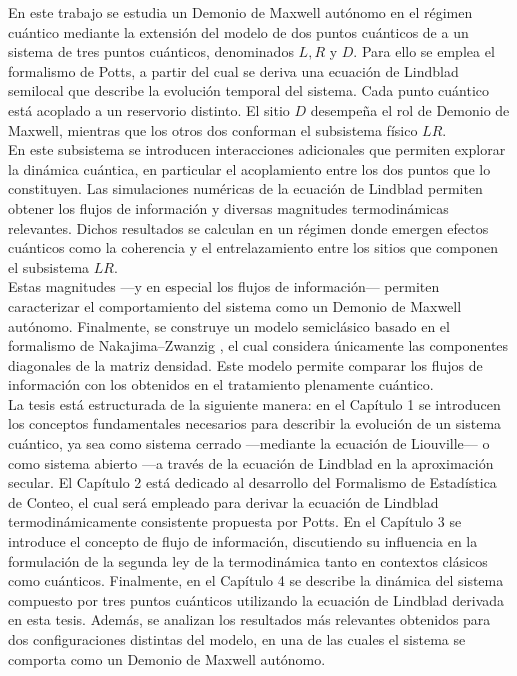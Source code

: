 En este trabajo se estudia un Demonio de Maxwell autónomo en el régimen cuántico mediante la extensión del modelo de dos puntos cuánticos de \cite{horowitz2014thermodynamics} a un sistema de tres puntos cuánticos, denominados $L,R$ y $D$. Para ello se emplea el formalismo de Potts, a partir del cual se deriva una ecuación de Lindblad semilocal que describe la evolución temporal del sistema. Cada punto cuántico está acoplado a un reservorio distinto. El sitio $D$ desempeña el rol de Demonio de Maxwell, mientras que los otros dos conforman el subsistema físico $LR$. \\

En este subsistema se introducen interacciones adicionales que permiten explorar la dinámica cuántica, en particular el acoplamiento entre los dos puntos que lo constituyen. Las simulaciones numéricas de la ecuación de Lindblad permiten obtener los flujos de información y diversas magnitudes termodinámicas relevantes. Dichos resultados se calculan en un régimen donde emergen efectos cuánticos como la coherencia y el entrelazamiento entre los sitios que componen el subsistema $LR$. \\ 

Estas magnitudes ---y en especial los flujos de información--- permiten caracterizar el comportamiento del sistema como un Demonio de Maxwell autónomo. 
Finalmente, se construye un modelo semiclásico basado en el formalismo de Nakajima--Zwanzig \cite{zwanzig1966statistical}, el cual considera únicamente las componentes diagonales de la matriz densidad. Este modelo permite comparar los flujos de información con los obtenidos en el tratamiento plenamente cuántico. \\


La tesis está estructurada de la siguiente manera: en el Capítulo 1 se introducen los conceptos fundamentales necesarios para describir la evolución de un sistema cuántico, ya sea como sistema cerrado —mediante la ecuación de Liouville— o como sistema abierto —a través de la ecuación de Lindblad en la aproximación secular. El Capítulo 2 está dedicado al desarrollo del Formalismo de Estadística de Conteo, el cual será empleado para derivar la ecuación de Lindblad termodinámicamente consistente propuesta por Potts. En el Capítulo 3 se introduce el concepto de flujo de información, discutiendo su influencia en la formulación de la segunda ley de la termodinámica tanto en contextos clásicos como cuánticos. Finalmente, en el Capítulo 4 se describe la dinámica del sistema compuesto por tres puntos cuánticos utilizando la ecuación de Lindblad derivada en esta tesis. Además, se analizan los resultados más relevantes obtenidos para dos configuraciones distintas del modelo, en una de las cuales el sistema se comporta como un Demonio de Maxwell autónomo.






